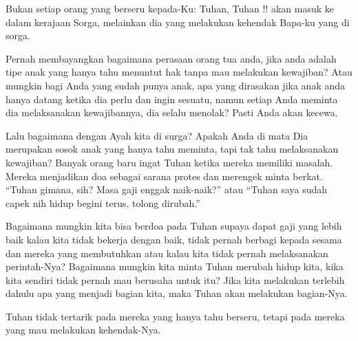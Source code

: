 
Bukan setiap orang yang berseru kepada-Ku: Tuhan, Tuhan !! akan masuk ke dalam kerajaan Sorga, melainkan dia yang melakukan kehendak Bapa-ku yang di sorga.

Pernah membayangkan bagaimana perasaan orang tua anda, jika anda adalah tipe anak yang hanya tahu menuntut hak tanpa mau melakukan kewajiban? Atau mungkin bagi Anda yang sudah punya anak, apa yang dirasakan jika anak anda hanya datang ketika dia perlu dan ingin sesuatu, namun setiap Anda meminta dia melaksanakan kewajibannya, dia selalu menolak? Pasti Anda akan kecewa. 

Lalu bagaimana dengan Ayah kita di surga? Apakah Anda di mata Dia merupakan sosok anak yang hanya tahu meminta, tapi tak tahu melaksanakan kewajiban? Banyak orang baru ingat Tuhan ketika mereka memiliki masalah. Mereka menjadikan doa sebagai sarana protes dan merengek minta berkat. “Tuhan gimana, sih? Masa gaji enggak naik-naik?” atau “Tuhan saya sudah capek nih hidup begini terus, tolong dirubah.”

Bagaimana mungkin kita bisa berdoa pada Tuhan supaya dapat gaji yang lebih baik kalau kita tidak bekerja dengan baik, tidak pernah berbagi kepada sesama dan mereka yang membutuhkan atau kalau kita tidak pernah melaksanakan perintah-Nya? Bagaimana mungkin kita minta Tuhan merubah hidup kita, kika kita sendiri tidak pernah mau berusaha untuk itu? Jika kita melakukan terlebih dahulu apa yang menjadi bagian kita, maka Tuhan akan melakukan bagian-Nya.

Tuhan tidak tertarik pada mereka yang hanya tahu berseru, tetapi pada mereka yang mau melakukan kehendak-Nya.

